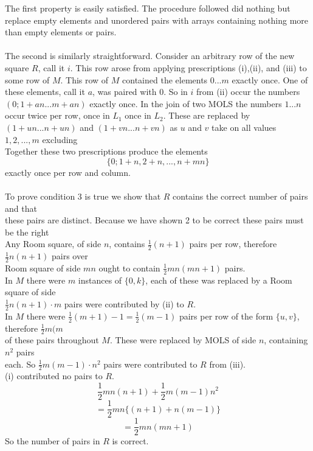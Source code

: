 \documentclass[
  12pt,
  a4paper]{book}
\begin{document}
The first property is easily satisfied. The procedure followed did
nothing but replace empty elements and unordered pairs with arrays
containing nothing more than empty elements or pairs.\\
~\\
The second is similarly straightforward. Consider an arbitrary row of
the new square \(R\), call it \(i\). This row arose from applying
prescriptions (i),(ii), and (iii) to some row of \(M\). This row of
\(M\) contained the elements \(0...m\) exactly once. One of these
elements, call it \(a\), was paired with 0. So in \(i\) from (ii) occur
the numbers \((0;1+an...m+an)\) exactly once. In the join of two MOLS
the numbers \(1...n\) occur twice per row, once in \(L_1\) once in
\(L_2\). These are replaced by \((1+un...n+un)\) and \((1+vn...n+vn)\)
as \(u\) and \(v\) take on all values \(1,2,...,m\) excluding\\
Together these two prescriptions produce the elements
\[\{0;1+n,2+n,...,n+mn\}\] exactly once per row and column.\\
~\\
To prove condition 3 is true we show that \(R\) contains the correct
number of pairs and that\\
these pairs are distinct. Because we have shown 2 to be correct these
pairs must be the right\\
Any Room square, of side \(n\), contains \(\frac{1}{2}(n+1)\) pairs per
row, therefore \(\frac{1}{2}n(n+1)\) pairs over\\
Room square of side \(mn\) ought to contain \(\frac{1}{2}mn(mn+1)\)
pairs.\\
In \(M\) there were \(m\) instances of \(\{0,k\}\), each of these was
replaced by a Room square of side\\
\(\frac{1}{2}n(n+1) \cdot m\) pairs were contributed by (ii) to \(R\).\\
In \(M\) there were \(\frac{1}{2}(m+1)-1 = \frac{1}{2} (m-1)\) pairs per
row of the form \(\{u,v\}\), therefore \(\frac{1}{2}m(m\)\\
of these pairs throughout \(M\). These were replaced by MOLS of side
\(n\), containing \(n^2\) pairs\\
each. So \(\frac{1}{2}m(m-1) \cdot n^2\) pairs were contributed to \(R\)
from (iii).\\
(i) contributed no pairs to \(R\).
\[\frac{1}{2} mn (n+1) + \frac{1}{2}m(m-1)n^2\]
\[=\frac{1}{2}mn\{(n+1)+n(m-1)\}\] \[=\frac{1}{2}mn(mn+1)\] So the
number of pairs in \(R\) is correct.\\
\end{document}
